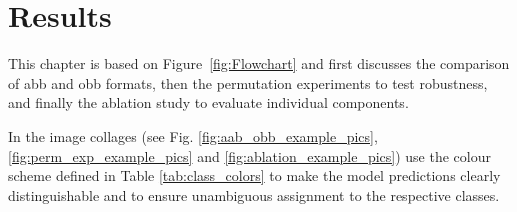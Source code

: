 \chapter{Results}
\label{ch:results}
This chapter is based on Figure~\ref{fig:Flowchart} and first discusses the comparison of \acrshort{abb} and \acrshort{obb} formats, then the permutation experiments to test robustness, and finally the ablation study to evaluate individual components.

In the image collages (see Fig. \ref{fig:aab_obb_example_pics}, \ref{fig:perm_exp_example_pics} and \ref{fig:ablation_example_pics}) use the colour scheme defined in Table \ref{tab:class_colors} to make the model predictions clearly distinguishable and to ensure unambiguous assignment to the respective classes.

